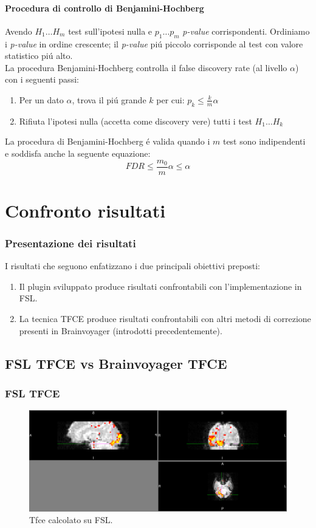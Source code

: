 \documentclass{beamer}
\begin{document}
\begin{frame}
\framesubtitle{Procedura di controllo di Benjamini-Hochberg}
Avendo $H_1 \dots H_m$ test sull'ipotesi nulla e $p_1 \dots p_m$ \textit{p-value} corrispondenti. Ordiniamo i \textit{p-value} in ordine crescente; il \textit{p-value} pi\'u piccolo corrisponde al test con valore statistico pi\'u alto.\\
\smallskip
La procedura Benjamini-Hochberg controlla il false discovery rate (al livello $\alpha$) con i seguenti passi:\\
\medskip
\begin{enumerate}
\item Per un dato $\alpha$, trova il pi\'u grande $k$ per cui: $p_k \leq \frac{k}{m}\alpha$
\item Rifiuta l'ipotesi nulla (accetta come discovery vere) tutti i test $H_1 \dots H_k$
\end{enumerate}
La procedura di Benjamini-Hochberg \'e valida quando i $m$ test sono indipendenti e soddisfa anche la seguente equazione:
\begin{equation*}
FDR \leq \frac{m_0}{m}\alpha \leq \alpha
\end{equation*}
\end{frame}

\section{Confronto risultati}

\begin{frame}
\frametitle{Presentazione dei risultati}
I risultati che seguono enfatizzano i due principali obiettivi preposti:
\begin{enumerate}
\item Il plugin sviluppato produce risultati confrontabili con l'implementazione in FSL.
\item La tecnica TFCE produce risultati confrontabili con altri metodi di correzione presenti in Brainvoyager (introdotti precedentemente).
\end{enumerate}
\end{frame}

\subsection{FSL TFCE vs Brainvoyager TFCE}
\begin{frame}
\frametitle{FSL TFCE}
\begin{figure}
    \centering
        \includegraphics[width=\textwidth]{Images/FSLcorrected.png}
	\caption{Tfce calcolato su FSL.}
\end{figure}
\end{frame}
\end{document}
